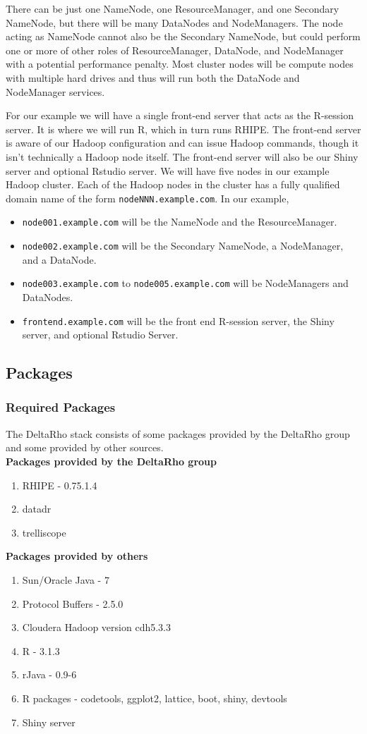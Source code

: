 There can be just one NameNode, one ResourceManager, and one Secondary
NameNode, but there will be many DataNodes and NodeManagers.  The node
acting as NameNode cannot also be the Secondary NameNode, but could
perform one or more of other roles of ResourceManager, DataNode, and
NodeManager with a potential  performance penalty.  Most cluster nodes
will be compute nodes with multiple hard drives and thus will run both
the DataNode and NodeManager services.

For our example we will have a single front-end server that acts as the
R-session server.  It is where we will run R, which in turn runs RHIPE.
The front-end server is aware of our Hadoop configuration and can issue
Hadoop commands, though it isn't technically a Hadoop node itself. The
front-end server will also be our Shiny server and optional Rstudio
server.  We will have five nodes in our example Hadoop cluster.  Each of
the Hadoop nodes in the cluster has a fully qualified domain
name of the form \verb|nodeNNN.example.com|. In our example,

\begin{itemize}
\item \verb|node001.example.com| will be the NameNode and the ResourceManager.
\item \verb|node002.example.com| will be the Secondary NameNode, a NodeManager, and a DataNode.
\item \verb|node003.example.com| to \verb|node005.example.com| will be NodeManagers and DataNodes.
\item \verb|frontend.example.com| will be the front end R-session server, the Shiny server, and optional Rstudio Server.
\end{itemize}

\subsection{Packages}
\subsubsection{Required Packages}
The DeltaRho stack consists of some packages provided by the DeltaRho group and some provided by other sources. \\

\textbf{Packages provided by the DeltaRho group}
\begin{enumerate}
\item RHIPE - 0.75.1.4
\item datadr
\item trelliscope
\end{enumerate}
\textbf{Packages provided by others}
\begin{enumerate}
\item Sun/Oracle Java - 7
\item Protocol Buffers - 2.5.0
\item Cloudera Hadoop version cdh5.3.3
\item R - 3.1.3
\item rJava - 0.9-6
\item R packages - codetools, ggplot2, lattice, boot, shiny, devtools
\item Shiny server
\end{enumerate}

